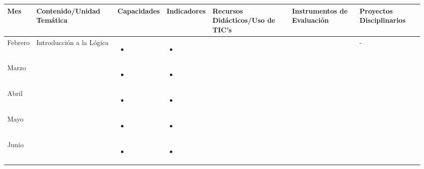 \documentclass[landscape, a4paper, 10pt]{article}
\newcommand{\smallcellwidth}{0.7in}
\newcommand{\normalcellwidth}{1.2in}
\newcommand{\bigcellwidth}{2.0in}
\begin{document}
	\begin{longtable}{|m{\smallcellwidth}|p{\normalcellwidth}|p{\bigcellwidth}|p{\bigcellwidth}|p{\normalcellwidth}|p{\normalcellwidth}|p{\normalcellwidth}|}
		\hline
		\textbf{Mes} &
		\textbf{Contenido/Unidad Temática} &
		\textbf{Capacidades} &
		\textbf{Indicadores} &
		\textbf{Recursos Didácticos/Uso de TIC's} &
		\textbf{Instrumentos de Evaluación} &
		\textbf{Proyectos Disciplinarios} \\
		\hline
		\endhead
		Febrero &
		Introducción a la Lógica &
		\begin{itemize}
			\item 
		\end{itemize} &
		\begin{itemize}
			\item 
		\end{itemize} &
		 &
		 &
		 - \\
		\hline
		Marzo &
		 &
		\begin{itemize}
			\item 
		\end{itemize} &
		\begin{itemize}
			\item 
		\end{itemize} &
		 \\
		\hline
		Abril &
		 &
		\begin{itemize}
			\item 
		\end{itemize} &
		\begin{itemize}
			\item 
 		\end{itemize} &
		 \\
		\hline
		Mayo &
		 &
		\begin{itemize}
			\item 
		\end{itemize} &
		\begin{itemize}
			\item 
 		\end{itemize} &
		 &
		 &
		 \\
		\hline
		Junio &
		 &
		\begin{itemize}
			\item 
		\end{itemize} &
		\begin{itemize}
			\item 

\end{itemize}
\end{longtable}
\end{document}
